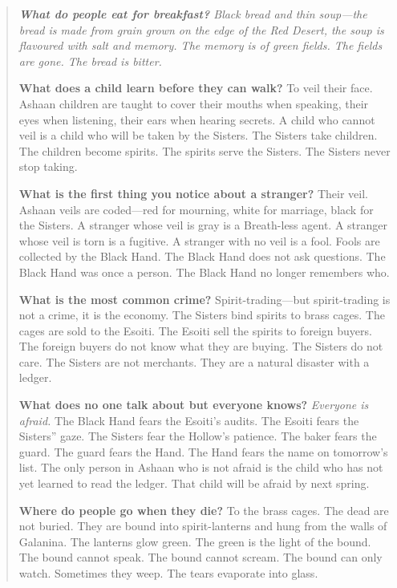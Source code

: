 \documentclass[12pt,oneside]{book}
\newenvironment{almanac}
  {\begin{quote}\small\itshape}
  {\end{quote}}
\begin{document}
\vspace{1em}

\begin{almanac}
\textbf{What do people eat for breakfast?} Black bread and thin soup---the bread is made from grain grown on the edge of the Red Desert, the soup is flavoured with salt and memory. The memory is of green fields. The fields are gone. The bread is bitter.

\textbf{What does a child learn before they can walk?} To veil their face. Ashaan children are taught to cover their mouths when speaking, their eyes when listening, their ears when hearing secrets. A child who cannot veil is a child who will be taken by the Sisters. The Sisters take children. The children become spirits. The spirits serve the Sisters. The Sisters never stop taking.

\textbf{What is the first thing you notice about a stranger?} Their veil. Ashaan veils are coded---red for mourning, white for marriage, black for the Sisters. A stranger whose veil is gray is a Breath-less agent. A stranger whose veil is torn is a fugitive. A stranger with no veil is a fool. Fools are collected by the Black Hand. The Black Hand does not ask questions. The Black Hand was once a person. The Black Hand no longer remembers who.

\textbf{What is the most common crime?} Spirit-trading---but spirit-trading is not a crime, it is the economy. The Sisters bind spirits to brass cages. The cages are sold to the Esoiti. The Esoiti sell the spirits to foreign buyers. The foreign buyers do not know what they are buying. The Sisters do not care. The Sisters are not merchants. They are a natural disaster with a ledger.

\textbf{What does no one talk about but everyone knows?} \textit{Everyone is afraid.} The Black Hand fears the Esoiti's audits. The Esoiti fears the Sisters'' gaze. The Sisters fear the Hollow's patience. The baker fears the guard. The guard fears the Hand. The Hand fears the name on tomorrow's list. The only person in Ashaan who is not afraid is the child who has not yet learned to read the ledger. That child will be afraid by next spring.

\textbf{Where do people go when they die?} To the brass cages. The dead are not buried. They are bound into spirit-lanterns and hung from the walls of Galanina. The lanterns glow green. The green is the light of the bound. The bound cannot speak. The bound cannot scream. The bound can only watch. Sometimes they weep. The tears evaporate into glass.


\end{almanac}
\end{document}
